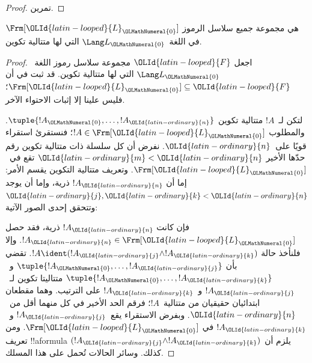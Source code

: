 \documentclass[../../../include/open-logic-section]{subfiles}
\begin{document}
\begin{proof}
تمرين.
\end{proof}

\begin{thm}
$\Frm[\OLId{latin-looped}{L}_\OLMathNumeral{0}]$ هي مجموعة جميع سلاسل الرموز في اللغة~$\Lang L_\OLMathNumeral{0}$ التي
لها متتالية تكوين.
\end{thm}

\begin{proof}
اجعل $\OLId{latin-looped}{F}$ مجموعة سلاسل رموز اللغة~$\Lang L_\OLMathNumeral{0}$ التي لها متتالية تكوين.
قد ثبت في  أن
$\Frm[\OLId{latin-looped}{L}_\OLMathNumeral{0}] \subseteq \OLId{latin-looped}{F}$؛ فليس علينا إلا إثبات الاحتواء الآخر.

لتكن لـ~$!A$ متتالية تكوين $\tuple{!A_\OLMathNumeral{0},\dotsc,!A_\OLId{latin-ordinary}{n}}$.
والمطلوب $!A \in \Frm[\OLId{latin-looped}{L}_\OLMathNumeral{0}]$؛ فنستقرئ استقراء قويًا على~$\OLId{latin-ordinary}{n}$.
نفرض أن كل سلسلة ذات متتالية تكوين رقم حدّها الأخير
$\OLId{latin-ordinary}{m} < \OLId{latin-ordinary}{n}$ تقع في~$\Frm[\OLId{latin-looped}{L}_\OLMathNumeral{0}]$. وتعريف متتالية التكوين يقسم الأمر: إما أن $!A_\OLId{latin-ordinary}{n}$ ذرية، وإما أن يوجد $\OLId{latin-ordinary}{j},\OLId{latin-ordinary}{k} < \OLId{latin-ordinary}{n}$ وتتحقق إحدى الصور الآتية:
\begin{enumerate}
\end{enumerate}
فإن كانت $!A_\OLId{latin-ordinary}{n}$ ذرية، فقد حصل
$!A_\OLId{latin-ordinary}{n} \in \Frm[\OLId{latin-looped}{L}_\OLMathNumeral{0}]$. وإلا فلنأخذ حالة $!A \ident
(!A_\OLId{latin-ordinary}{j} \land !A_\OLId{latin-ordinary}{k})$. تقضي  بأن
$\tuple{!A_\OLMathNumeral{0},\dotsc,!A_\OLId{latin-ordinary}{j}}$ و~$\tuple{!A_\OLMathNumeral{0},\dotsc,!A_\OLId{latin-ordinary}{k}}$ متتاليتا تكوين لـ~$!A_\OLId{latin-ordinary}{j}$ و~$!A_\OLId{latin-ordinary}{k}$ على الترتيب. وهما مقطعان ابتدائيان حقيقيان من متتالية~$!A$؛ فرقم الحد الأخير في كل منهما أقل من~$\OLId{latin-ordinary}{n}$. وبفرض الاستقراء يقع~$!A_\OLId{latin-ordinary}{j}$ و~$!A_\OLId{latin-ordinary}{k}$ في
$\Frm[\OLId{latin-looped}{L}_\OLMathNumeral{0}]$. ومن تعريف !!a{formula} يلزم أن
$(!A_\OLId{latin-ordinary}{j} \land !A_\OLId{latin-ordinary}{k})$ كذلك. وسائر الحالات تُحمل على هذا المسلك.
\end{proof}
\end{document}
